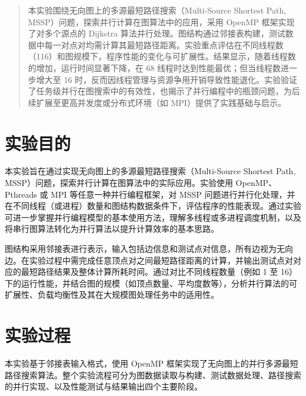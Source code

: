 \documentclass[a4paper, utf8]{ctexart}
\begin{document}
	\maketitle
	
	\renewcommand{\abstractname}{\large \textbf{摘要}}
	\begin{abstract}
		本实验围绕无向图上的多源最短路径搜索（Multi-Source Shortest Path, MSSP）问题，探索并行计算在图算法中的应用，采用 OpenMP 框架实现了对多个源点的 Dijkstra 算法并行处理。图结构通过邻接表构建，测试数据中每一对点对均需计算其最短路径距离。实验重点评估在不同线程数（116）和图规模下，程序性能的变化与可扩展性。结果显示，随着线程数的增加，运行时间显著下降，在 68 线程时达到性能最优；但当线程数进一步增大至 16 时，反而因线程管理与资源争用开销导致性能退化。实验验证了任务级并行在图搜索中的有效性，也揭示了并行编程中的瓶颈问题，为后续扩展至更高并发度或分布式环境（如 MPI）提供了实践基础与启示。
		
	\end{abstract}
	
	\section{实验目的}
	
	本实验旨在通过实现无向图上的多源最短路径搜索（Multi-Source Shortest Path, MSSP）问题，探索并行计算在图算法中的实际应用。实验使用 OpenMP、Pthreads 或 MPI 等任意一种并行编程框架，对 MSSP 问题进行并行化处理，并在不同线程（或进程）数量和图结构数据条件下，评估程序的性能表现。通过实验可进一步掌握并行编程模型的基本使用方法，理解多线程或多进程调度机制，以及将串行图算法转化为并行算法以提升计算效率的基本思路。
	
	图结构采用邻接表进行表示，输入包括边信息和测试点对信息，所有边视为无向边。在实验过程中需完成任意顶点对之间最短路径距离的计算，并输出测试点对对应的最短路径结果及整体计算所耗时间。通过对比不同线程数量（例如 1 至 16）下的运行性能，并结合图的规模（如顶点数量、平均度数等），分析并行算法的可扩展性、负载均衡性及其在大规模图处理任务中的适用性。
	
	\section{实验过程}
	
	本实验基于邻接表输入格式，使用 OpenMP 框架实现了无向图上的并行多源最短路径搜索算法。整个实验流程可分为图数据读取与构建、测试数据处理、路径搜索的并行实现、以及性能测试与结果输出四个主要阶段。
	
\end{document}
